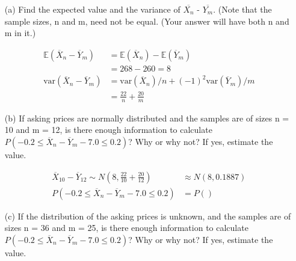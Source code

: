 \begin{itemize}
        \begin{itemize}
            \item [(a)]
            Find the expected value and the variance of $\overline{X_{n}}$ - $\overline{Y_{m}}$. (Note that the sample sizes, n and m, need not be equal. (Your answer will have both n and m in it.)
            \\
            \begin{mdframed}
                \begin{align*}
                    \mathbb{E}(\overline{X}_{n} - \overline{Y}_{m})
                        & = \mathbb{E}(\overline{X}_{n}) - \mathbb{E}(\overline{Y}_{m}) \\
                        & = 268 - 260 = \boxed{8}                                       \\
                    \text{var}(\overline{X}_{n} - \overline{Y}_{m})
                        & = \text{var}(\overline{X}_{n})/n+(-1)^{2}\text{var}(\overline{Y}_{m})/m\\
                        & = \boxed{\frac{22}{n} + \frac{20}{m}}
                \end{align*}
            \end{mdframed}

            \item [(b)]
            If asking prices are normally distributed and the samples are of sizes n = 10 and m = 12, is there enough information to calculate $P(-0.2 \leq \overline{X}_{n} - \overline{Y}_{m} - 7.0 \leq 0.2)$? Why or why not? If yes, estimate the value.
            \\
            \begin{mdframed}
                \begin{align*}
                    \overline{X}_{10} - \overline{Y}_{12} \sim N\left(8,\frac{22}{10} 
                    + \frac{20}{12}\right) & \approx N(8, 0.1887)                       \\
                    P(-0.2 \leq \overline{X}_{n} - \overline{Y}_{m} - 7.0 \leq 0.2)
                        & = P()
                \end{align*}
            \end{mdframed}

            \pagebreak

            \item [(c)]
            If the distribution of the asking prices is unknown, and the samples are of sizes n = 36 and m = 25, is there enough information to calculate $P(-0.2 \leq \overline{X}_{n} - \overline{Y}_{m} - 7.0 \leq 0.2)$? Why or why not? If yes, estimate the value.
            \\
            \begin{mdframed}
                

\end{mdframed}
\end{itemize}
\end{itemize}

